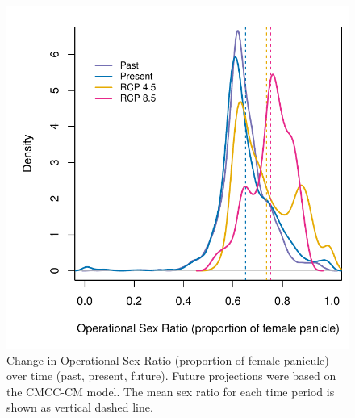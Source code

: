 \documentclass[12pt]{article}\usepackage[]{graphicx}\usepackage[dvipsnames]{xcolor}
\begin{document}
\begin{figure}[H]
  \begin{center}
    \includegraphics[width=0.8\linewidth]{Figures/POAR_OSR.pdf}
  \caption{Change in Operational Sex Ratio (proportion of female panicule) over time (past, present, future).
  Future projections were based on the CMCC-CM model.
  The mean sex ratio for each time period is shown as vertical dashed line.}
  \label{fig:srprojcmc}
  \end{center}
\end{figure}
\end{document}
